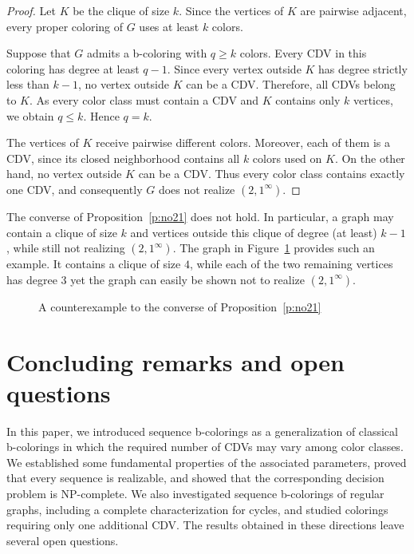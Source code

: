 \documentclass{article}
\theoremstyle{definition}
\begin{document}
\begin{proof}
Let $K$ be the clique of size $k$. Since the vertices of $K$ are pairwise adjacent, every proper coloring of $G$ uses at least $k$ colors.

Suppose that $G$ admits a b-coloring with $q \ge k$ colors. Every CDV in this coloring has degree at least $q-1$. Since every vertex outside $K$ has degree strictly less than $k-1$, no vertex outside $K$ can be a CDV. Therefore, all CDVs belong to $K$. As every color class must contain a CDV and $K$ contains only $k$ vertices, we obtain $q\le k$. Hence $q=k$.

The vertices of $K$ receive pairwise different colors. Moreover, each of them is a CDV, since its closed neighborhood contains all $k$ colors used on $K$. On the other hand, no vertex outside $K$ can be a CDV. Thus every color class contains exactly one CDV, and consequently $G$ does not realize $(2,1^\infty)$.
\end{proof}

\medskip

The converse of Proposition~\ref{p:no21} does not hold. In particular, a graph may contain a clique of size $k$ and vertices outside this clique of degree (at least) $k-1$, while still not realizing $(2,1^\infty)$. The graph in Figure~\ref{f:clique} provides such an example. It contains a clique of size $4$, while each of the two remaining vertices has degree $3$ yet the graph can easily be shown not to realize $(2,1^\infty)$.

\begin{figure}[ht]
\centering
{}
\caption{A counterexample to the converse of Proposition~\ref{p:no21}}
\label{f:clique}
\end{figure}

\section{Concluding remarks and open questions}

In this paper, we introduced sequence b-colorings as a generalization of classical b-colorings in which the required number of CDVs may vary among color classes. We established some fundamental properties of the associated parameters, proved that every sequence is realizable, and showed that the corresponding decision problem is NP-complete. We also investigated sequence b-colorings of regular graphs, including a complete characterization for cycles, and studied colorings requiring only one additional CDV. The results obtained in these directions leave several open questions.
\end{document}
